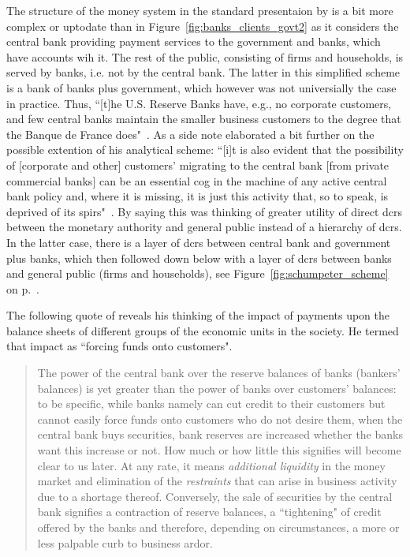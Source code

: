 The structure of the money system in the standard presentaion by \cite{schumpeter2014} is a bit more complex or uptodate than in Figure~\ref{fig:banks_clients_govt2} as it considers the central bank providing payment services to the government and banks, which have accounts wih it. The rest of the public, consisting of firms and households, is served by banks, i.e. not by the central bank. The latter in this simplified scheme is a bank of banks plus government, which however was not universially the case in practice. Thus, ``[t]he U.S. Reserve Banks have, e.g., no corporate customers, and few central banks maintain the smaller business customers to the degree that the Banque de France does"~\citep[p.~167]{schumpeter2014}. As a side note \citeauthor{schumpeter2014} elaborated a bit further on the possible extention of his analytical scheme: ``[i]t is also evident that the possibility of [corporate and other] customers' migrating to the central bank [from private commercial banks] can be an essential cog in the machine of any active central bank policy and, where it is missing, it is just this activity that, so to speak, is deprived of its spirs"~\citep[pp.~167-168]{schumpeter2014}. By saying this \citeauthor{schumpeter2014} was thinking of greater utility of direct \acfp{dcr} between the monetary authority and general public instead of a hierarchy of \acp{dcr}. In the latter case, there is a layer of \acp{dcr} between central bank and government plus banks, which then followed down below with a layer of \acp{dcr} between banks and general public (firms and households), see Figure~\ref{fig:schumpeter_scheme} on p.~\pageref{fig:schumpeter_scheme}.

The following quote of \cite{schumpeter2014} reveals his thinking of the impact of payments upon the balance sheets of different groups of the economic units in the society. He termed that impact as ``forcing funds onto customers". 

\begin{quote}
The power of the central bank over the reserve balances of banks (bankers' balances) is yet greater than the power of banks over customers' balances: to be specific, while banks
namely can cut credit to their customers but cannot easily force funds onto
customers who do not desire them, when the central bank buys securities, bank
reserves are increased whether the banks want this increase or not. How much or
how little this signifies will become clear to us later. At any rate, it means
\textit{additional liquidity} in the money market and elimination of the \textit{restraints} that can arise in business activity due to a shortage thereof. Conversely, the sale of
securities by the central bank signifies a contraction of reserve balances, a
``tightening" of credit offered by the banks and therefore, depending on
circumstances, a more or less palpable curb to business ardor.~\citep[p.~174, emphasis original]{schumpeter2014} 
\end{quote}

